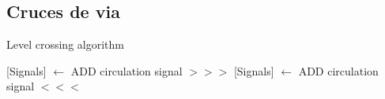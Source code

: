 \subsection{Cruces de via}

\lipsum[1]

\begin{algorithm}[hbt!]
            \caption{Level crossing algorithm}\label{alg:LC}
            \DontPrintSemicolon
            \SetNoFillComment
            \LinesNotNumbered 
            {
                [Signals] $\gets$ ADD circulation signal $>>>$\;
                [Signals] $\gets$ ADD circulation signal $<<<$\;
            }
            \KwResult{[Signals]} 
        \end{algorithm}